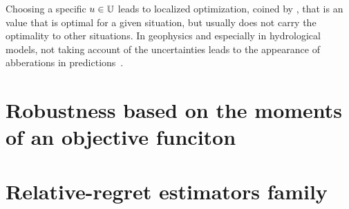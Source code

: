 \documentclass[../../Main_ManuscritThese.tex]{subfiles}
\begin{document}
Choosing a specific $u \in \mathbb{U}$ leads to localized optimization,  coined by , that is an value that is optimal for a given situation, but usually does not carry the optimality to other situations.
In geophysics and especially in hydrological models, not taking account of the uncertainties leads to the appearance of abberations in predictions~\cite{kuczera_there_2010}.
\label{sec:def_robustness}


\section{Robustness based on the moments of an objective funciton}
\label{sec:rob_moments}

\section{Relative-regret estimators family}
\label{sec:rr_family}



\subfileLocal{
	\pagestyle{empty}
	
	
      }
\end{document}
